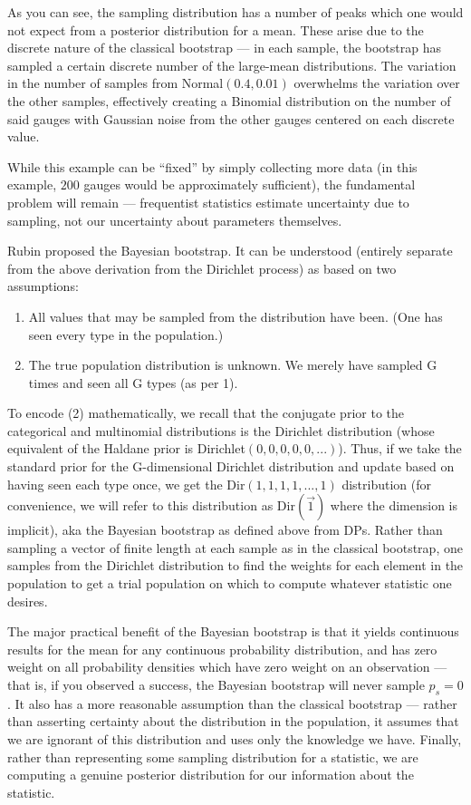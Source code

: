 As you can see, the sampling distribution has a number of peaks which one would not expect from a posterior distribution for a mean. These arise due to the discrete nature of the classical bootstrap --- in each sample, the bootstrap has sampled a certain discrete number of the large-mean distributions. The variation in the number of samples from Normal$(0.4,0.01)$ overwhelms the variation over the other samples, effectively creating a Binomial distribution on the number of said gauges with Gaussian noise from the other gauges centered on each discrete value.

While this example can be ``fixed'' by simply collecting more data (in this example, $200$ gauges would be approximately sufficient), the fundamental problem will remain --- frequentist statistics estimate uncertainty due to sampling, not our uncertainty about parameters themselves.

Rubin \cite{rubin1981bayesian} proposed the Bayesian bootstrap. It can be understood (entirely separate from the above derivation from the Dirichlet process) as based on two assumptions:

\begin{enumerate}
	\item All values that may be sampled from the distribution have been. (One has seen every type in the population.)
	\item The true population distribution is unknown. We merely have sampled G times and seen all G types (as per 1).
\end{enumerate}

To encode (2) mathematically, we recall that the conjugate prior to the categorical and multinomial distributions is the Dirichlet distribution (whose equivalent of the Haldane prior is Dirichlet$(0,0,0,0,0,...)$). Thus, if we take the standard prior for the G-dimensional Dirichlet distribution and update based on having seen each type once, we get the Dir$(1,1,1,1,...,1)$ distribution (for convenience, we will refer to this distribution as Dir$(\vec{1})$ where the dimension is implicit), aka the Bayesian bootstrap as defined above from DPs. Rather than sampling a vector of finite length at each sample as in the classical bootstrap, one samples from the Dirichlet distribution to find the weights for each element in the population to get a trial population on which to compute whatever statistic one desires.

The major practical benefit of the Bayesian bootstrap is that it yields continuous results for the mean for any continuous probability distribution, and has zero weight on all probability densities which have zero weight on an observation --- that is, if you observed a success, the Bayesian bootstrap will never sample $p_s=0$. It also has a more reasonable assumption than the classical bootstrap --- rather than asserting certainty about the distribution in the population, it assumes that we are ignorant of this distribution and uses only the knowledge we have. Finally, rather than representing some sampling distribution for a statistic, we are computing a genuine posterior distribution for our information about the statistic.


